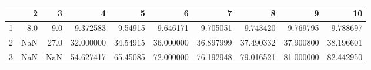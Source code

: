 \begin{tabular}{lrrrrrrrrr}
\toprule
{} &   2  &    3  &         4  &        5  &         6  &         7  &         8  &         9  &         10 \\
\midrule
1 &  8.0 &   9.0 &   9.372583 &   9.54915 &   9.646171 &   9.705051 &   9.743420 &   9.769795 &   9.788697 \\
2 &  NaN &  27.0 &  32.000000 &  34.54915 &  36.000000 &  36.897999 &  37.490332 &  37.900800 &  38.196601 \\
3 &  NaN &   NaN &  54.627417 &  65.45085 &  72.000000 &  76.192948 &  79.016521 &  81.000000 &  82.442950 \\
\bottomrule
\end{tabular}

